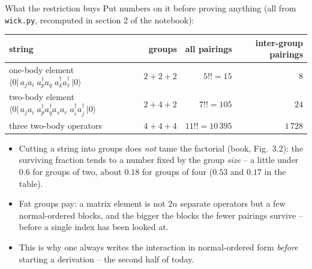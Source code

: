 \documentclass[aspectratio=169,10pt]{beamer}
\newcommand{\ket}[1]{\vert #1\rangle}
\newcommand{\bra}[1]{\langle #1\vert}
\begin{document}
\begin{frame}{What the restriction buys}
  \small
  Put numbers on it before proving anything (all from \texttt{wick.py}, recomputed in section 2 of the notebook):
  \begin{center}
  \renewcommand{\arraystretch}{1.2}
  \begin{tabular}{lrrr}
    \toprule
    string & groups & all pairings & inter-group pairings\\
    \midrule
    one-body element $\bra{0}\,a_ja_i\;a_p^{\dagger}a_q\;a_k^{\dagger}a_\ell^{\dagger}\,\ket{0}$ & $2+2+2$ & $5!!=15$ & $8$\\
    two-body element $\bra{0}\,a_ja_i\;a_p^{\dagger}a_q^{\dagger}a_sa_r\;a_i^{\dagger}a_j^{\dagger}\,\ket{0}$ & $2+4+2$ & $7!!=105$ & $24$\\
    three two-body operators & $4+4+4$ & $11!!=10\,395$ & $1\,728$\\
    \bottomrule
  \end{tabular}
  \end{center}
  \begin{itemize}
    \item Cutting a string into groups does \emph{not} tame the factorial (book, Fig.~3.2): the surviving fraction tends to a number fixed by the group \emph{size} -- a little under $0.6$ for groups of two, about $0.18$ for groups of four ($0.53$ and $0.17$ in the table).
    \item \alert{Fat groups pay}: a matrix element is not $2n$ separate operators but a few normal-ordered blocks, and the bigger the blocks the fewer pairings survive -- before a single index has been looked at.
    \item This is why one always writes the interaction in normal-ordered form \emph{before} starting a derivation -- the second half of today.
  \end{itemize}
\end{frame}
\end{document}
